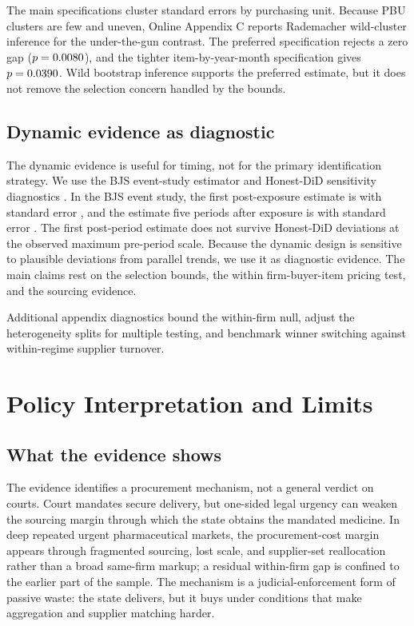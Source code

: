 The main specifications cluster standard errors by purchasing unit. Because PBU clusters are few and uneven, Online Appendix C reports Rademacher wild-cluster inference for the under-the-gun contrast. The preferred specification rejects a zero gap ($p=0.0080{}$), and the tighter item-by-year-month specification gives $p=0.0390{}$. Wild bootstrap inference supports the preferred estimate, but it does not remove the selection concern handled by the bounds.

\subsection{Dynamic evidence as diagnostic}
\label{subsec:dynamic}

The dynamic evidence is useful for timing, not for the primary identification strategy. We use the BJS event-study estimator and Honest-DiD sensitivity diagnostics \citep{borusyak2024revisiting,rambachan2023more}. In the BJS event study, the first post-exposure estimate is \BPbjsETzero{} with standard error \BPbjsETzeroSE{}, and the estimate five periods after exposure is \BPbjsETfive{} with standard error \BPbjsETfiveSE{}. The first post-period estimate does not survive Honest-DiD deviations at the observed maximum pre-period scale. Because the dynamic design is sensitive to plausible deviations from parallel trends, we use it as diagnostic evidence. The main claims rest on the selection bounds, the within firm-buyer-item pricing test, and the sourcing evidence.

Additional appendix diagnostics bound the within-firm null, adjust the heterogeneity splits for multiple testing, and benchmark winner switching against within-regime supplier turnover.

\section{Policy Interpretation and Limits}
\label{sec:policy}

\subsection{What the evidence shows}
\label{subsec:shows}

The evidence identifies a procurement mechanism, not a general verdict on courts. Court mandates secure delivery, but one-sided legal urgency can weaken the sourcing margin through which the state obtains the mandated medicine. In deep repeated urgent pharmaceutical markets, the procurement-cost margin appears through fragmented sourcing, lost scale, and supplier-set reallocation rather than a broad same-firm markup; a residual within-firm gap is confined to the earlier part of the sample. The mechanism is a judicial-enforcement form of passive waste: the state delivers, but it buys under conditions that make aggregation and supplier matching harder.

